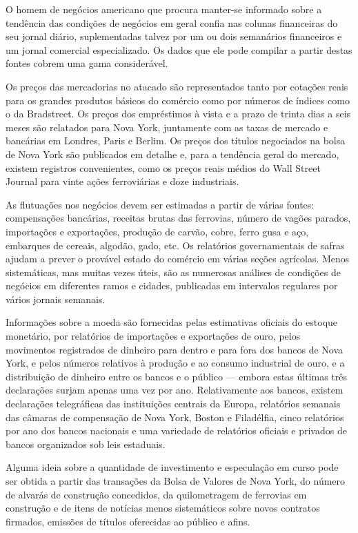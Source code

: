 \documentclass[12pt]{article}
\begin{document}
O homem de negócios americano que procura manter-se informado sobre a tendência das condições de negócios em geral confia nas colunas financeiras do seu jornal diário, suplementadas talvez por um ou dois semanários financeiros e um jornal comercial especializado. Os dados que ele pode compilar a partir destas fontes cobrem uma gama considerável.

Os preços das mercadorias no atacado são representados tanto por cotações reais para os grandes produtos básicos do comércio como por números de índices como o da Bradstreet. Os preços dos empréstimos à vista e a prazo de trinta dias a seis meses são relatados para Nova York, juntamente com as taxas de mercado e bancárias em Londres, Paris e Berlim. Os preços dos títulos negociados na bolsa de Nova York são publicados em detalhe e, para a tendência geral do mercado, existem registros convenientes, como os preços reais médios do Wall Street Journal para vinte ações ferroviárias e doze industriais.

As flutuações nos negócios devem ser estimadas a partir de várias fontes: compensações bancárias, receitas brutas das ferrovias, número de vagões parados, importações e exportações, produção de carvão, cobre, ferro gusa e aço, embarques de cereais, algodão, gado, etc. Os relatórios governamentais de safras ajudam a prever o provável estado do comércio em várias seções agrícolas. Menos sistemáticas, mas muitas vezes úteis, são as numerosas análises de condições de negócios em diferentes ramos e cidades, publicadas em intervalos regulares por vários jornais semanais.

Informações sobre a moeda são fornecidas pelas estimativas oficiais do estoque monetário, por relatórios de importações e exportações de ouro, pelos movimentos registrados de dinheiro para dentro e para fora dos bancos de Nova York, e pelos números relativos à produção e ao consumo industrial de ouro, e a distribuição de dinheiro entre os bancos e o público — embora estas últimas três declarações surjam apenas uma vez por ano. Relativamente aos bancos, existem declarações telegráficas das instituições centrais da Europa, relatórios semanais das câmaras de compensação de Nova York, Boston e Filadélfia, cinco relatórios por ano dos bancos nacionais e uma variedade de relatórios oficiais e privados de bancos organizados sob leis estaduais.

Alguma ideia sobre a quantidade de investimento e especulação em curso pode ser obtida a partir das transações da Bolsa de Valores de Nova York, do número de alvarás de construção concedidos, da quilometragem de ferrovias em construção e de itens de notícias menos sistemáticos sobre novos contratos firmados, emissões de títulos oferecidas ao público e afins.
\end{document}
